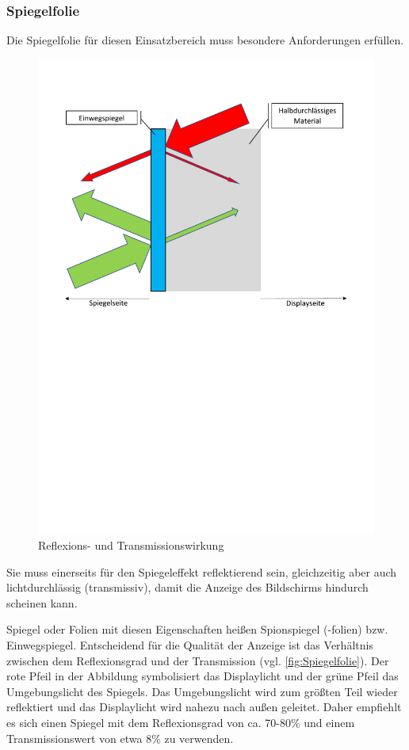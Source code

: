 \subsubsection*{Spiegelfolie}
Die Spiegelfolie für diesen Einsatzbereich muss besondere Anforderungen erfüllen. 
\begin{figure}
	\includegraphics[trim=10mm 140mm 30mm 80mm, scale=0.35]{bilder/Einwegspiegel.pdf}
	\caption{Reflexions- und Transmissionswirkung}
	\label{fig:Spiegelfolie}
\end{figure}
Sie muss einerseits für den Spiegeleffekt reflektierend sein, gleichzeitig aber auch lichtdurchlässig (transmissiv), damit die Anzeige des Bildschirms hindurch scheinen kann. 

Spiegel oder Folien mit diesen Eigenschaften heißen Spionspiegel (-folien) bzw. Einwegspiegel. Entscheidend für die Qualität der Anzeige ist das Verhältnis zwischen dem Reflexionsgrad und der Transmission (vgl. \autoref{fig:Spiegelfolie}). Der rote Pfeil in der Abbildung symbolisiert das Displaylicht und der grüne Pfeil das Umgebungslicht des Spiegels. Das Umgebungslicht wird zum größten Teil wieder reflektiert und das Displaylicht wird nahezu nach außen geleitet. Daher empfiehlt es sich einen Spiegel mit dem Reflexionsgrad von ca. 70-80\% und einem Transmissionswert von etwa 8\% zu verwenden. 



